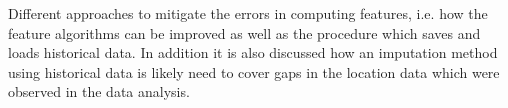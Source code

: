 Different approaches to mitigate the errors in computing features, i.e. how the feature algorithms can be improved as well as the procedure which saves and loads historical data. In addition it is also discussed how an imputation method using historical data is likely need to cover gaps in the location data which were observed in the data analysis.